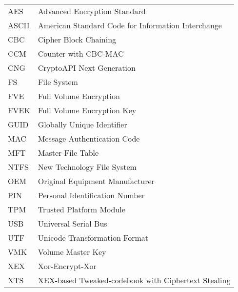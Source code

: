 
\seznamzkr

\begin{tabular}{ll}
  AES & Advanced Encryption Standard \\
  ASCII & American Standard Code for Information Interchange \\
  CBC & Cipher Block Chaining \\
  CCM & Counter with CBC-MAC \\
  CNG & CryptoAPI Next Generation \\
  FS &  File System \\
  FVE & Full Volume Encryption \\
  FVEK & Full Volume Encryption Key \\
  GUID & Globally Unique Identifier \\
  MAC & Message Authentication Code \\
  MFT & Master File Table \\
  NTFS & New Technology File System \\
  OEM & Original Equipment Manufacturer \\
  PIN & Personal Identification Number \\
  TPM & Trusted Platform Module \\
  USB & Universal Serial Bus \\
  UTF & Unicode Transformation Format \\
  VMK & Volume Master Key \\
  XEX & Xor-Encrypt-Xor \\
  XTS & XEX-based Tweaked-codebook with Ciphertext Stealing \\
\end{tabular}

